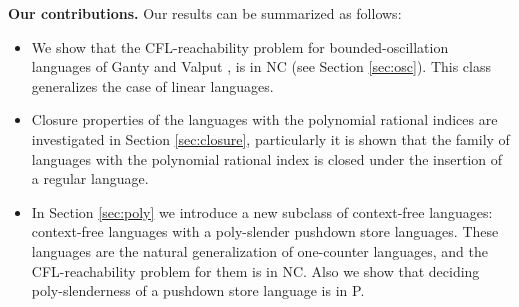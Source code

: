\documentclass{ws-ijfcs}
\begin{document}
\textbf{Our contributions.} Our results can be summarized as follows:
\begin{itemize}
\item We show that the CFL-reachability problem for bounded-oscillation languages of Ganty and Valput \cite{BoundOsc}, is in NC (see Section \ref{sec:osc}). This class generalizes the case of linear languages. 
\item Closure properties of the languages with the polynomial rational indices are investigated in Section \ref{sec:closure}, particularly it is shown that the family of languages with the polynomial rational index is closed under the insertion of a regular language.
\item In Section \ref{sec:poly} we introduce a new subclass of context-free languages: context-free languages with a poly-slender pushdown store languages. These languages are the natural generalization of one-counter languages, and the CFL-reachability problem for them is in NC. Also we show that deciding poly-slenderness of a pushdown store language is in P.
\end{itemize}






\end{document}
